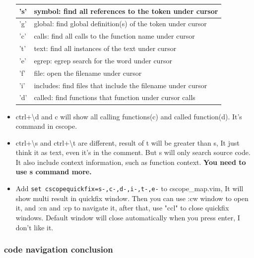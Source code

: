 \documentclass[paper=8.5in:11in, twoside, 12pt, pagesize=pdftex]{book}
\begin{document}
\begin{itemize}
										\begin{tabular}{p{}|p{}}
											\hline 
											's'  & symbol: find all references to the token under cursor \\
											\hline 
											'g'  & global: find global definition(s) of the token under cursor \\
											\hline 
											'c'  & calls:  find all calls to the function name under cursor \\
											\hline 
											't'  & text:   find all instances of the text under cursor \\
											\hline 
											'e'  & egrep:  egrep search for the word under cursor \\
											\hline 
											'f'  & file:   open the filename under cursor \\
											\hline 
											'i'  & includes: find files that include the filename under cursor \\
											\hline 
											'd' &  called: find functions that function under cursor calls \\
											\hline
										\end{tabular}
										
										
										\item ctrl+\textbackslash d and c will show all calling functions(c) and called function(d). It's command in cscope.
										
										\item ctrl+\textbackslash s and ctrl+\textbackslash t are different, result of t will be greater than s, It just think it as text, even it's in the comment. But s will only search source code. It also include context information, such as function context. \textbf{You need to use s command more.}
										
										
										\item Add \verb!set cscopequickfix=s-,c-,d-,i-,t-,e-! to cscope\_map.vim, It will show multi result in quickfix window. Then you can use :cw window to open it, and :cn and :cp to navigate it, after that, use "ccl" to close quickfix windows.  Default window will close automatically when you press enter, I don't like it. 
										
									\end{itemize}
									
									\subsubsection{code navigation conclusion}
									
\end{document}
